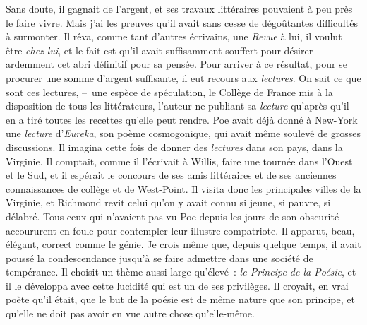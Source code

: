 \documentclass[french,twoside]{book} %
\begin{document}
Sans doute, il gagnait de l’argent, et ses travaux littéraires pouvaient à peu près le faire vivre. Mais j’ai les preuves qu’il avait sans cesse de dégoûtantes difficultés à surmonter. Il rêva, comme tant d’autres écrivains, une\emph{ Revue} à lui, il voulut être \emph{chez lui}, et le fait est qu’il avait suffisamment souffert pour désirer ardemment cet abri définitif pour sa pensée. Pour arriver à ce résultat, pour se procurer une somme d’argent suffisante, il eut recours aux\emph{ lectures}. On sait ce que sont ces lectures, – une espèce de spéculation, le Collège de France mis à la disposition de tous les littérateurs, l’auteur ne publiant sa \emph{lecture} qu’après qu’il en a tiré toutes les recettes qu’elle peut rendre. Poe avait déjà donné à New-York une \emph{lecture} d’\emph{Eureka}, son poème cosmogonique, qui avait même soulevé de grosses discussions. Il imagina cette fois de donner des\emph{ lectures} dans son pays, dans la Virginie. Il comptait, comme il l’écrivait à Willis, faire une tournée dans l’Ouest et le Sud, et il espérait le concours de ses amis littéraires et de ses anciennes connaissances de collège et de West-Point. Il visita donc les principales villes de la Virginie, et Richmond revit celui qu’on y avait connu si jeune, si pauvre, si délabré. Tous ceux qui n’avaient pas vu Poe depuis les jours de son obscurité accoururent en foule pour contempler leur illustre compatriote. Il apparut, beau, élégant, correct comme le génie. Je crois même que, depuis quelque temps, il avait poussé la condescendance jusqu’à se faire admettre dans une société de tempérance. Il choisit un thème aussi large qu’élevé : \emph{le Principe de la Poésie}, et il le développa avec cette lucidité qui est un de ses privilèges. Il croyait, en vrai poète qu’il était, que le but de la poésie est de même nature que son principe, et qu’elle ne doit pas avoir en vue autre chose qu’elle-même.\par
\end{document}
